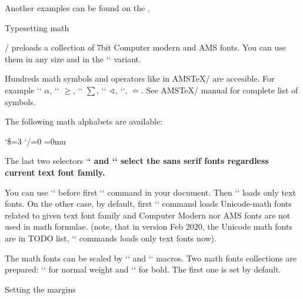 {\begtt
\def\printbib{\hangindent=\parindent \indent \llap{\the\bibnum. }}
\def\printbib{\hangindent=\parindent \noindent [\the\bibmark]\quad}
\endtt 

Another examples can be found on the 
.


\sec Typesetting math

\OpTeX/ preloads a collection of 7bit Computer modern and AMS fonts.
You can use them in any size and in the `\boldmath` variant.

Hundreds math symbols and operators like in AMS\TeX/ are accesible. 
For example  `\alpha` $\alpha$, `\geq` $\geq$, `\sum` $\sum$, 
`\sphericalangle` $\sphericalangle$, `\bumpeq`, $\bumpeq$. See AMS\TeX/
manual for complete list of symbols.

The following math alphabets are available:

\begtt    \catcode`\$=3 \catcode`/=0 \medmuskip=0mu \adef{ }{ }
\mit     %
\it      %
\rm      %
\cal     %
\script  %
\frak    %
\bbchar  %
\bf      %
\bi      %
\endtt

The last two selectors `\bf` and `\bi` select the sans serif fonts regardless
current text font family. 

You can use `\noloadmath` before first `\fontfam` command in your document.
Then `\fontfam` loads only text fonts. On the other case, by default, first
`\fontfam` command loads Unicode-math fonts related to given text font
family and Computer Modern nor AMS fonts are not used in math formulae.
(note, that in version Feb 2020, the Unicode math fonts are in TODO list,
`\fontfam` commands loads only text fonts now).

The math fonts can be scaled by `\typosize` and `\typoscale` macros.
Two math fonts collections are prepared: `\normalmath` for normal weight
and `\boldmath` for bold. The first one is set by default.


\sec Setting the margins

}
